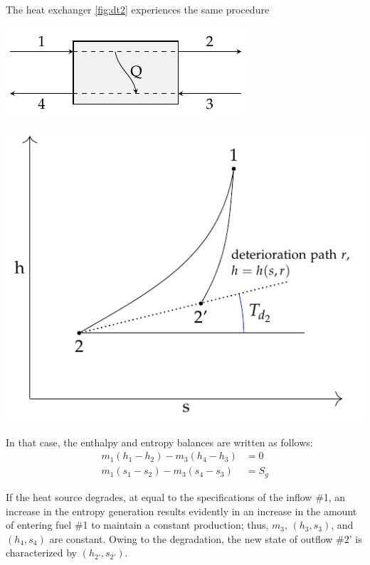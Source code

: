 \documentclass[energies,article,submit,moreauthors,pdftex]{Definitions/mdpi}
\begin{document}
The heat exchanger \cref{fig:dt2} experiences the same procedure  
\begin{center}
	\begin{minipage}[c]{0.38\linewidth}
		\centering
		\includegraphics{heater}
	\end{minipage}
	\begin{minipage}[c]{0.58\linewidth}
		\centering
		\includegraphics[scale=0.8]{dt2}
	\end{minipage}
	\label{fig:dt2}
\end{center}

In that case, the enthalpy and entropy balances are written as follows: 
\begin{align}
m_1 \left(h_1 - h_2 \right) - m_3 \left(h_4 -h_3\right) &= 0 \\
m_1 \left(s_1 - s_2 \right) - m_3 \left(s_4 - s_3 \right) &= S_g 
\end{align}

If the heat source degrades, at equal to the specifications of the inflow \#1, an increase in the entropy generation results evidently in an increase in the amount of entering fuel \#1 to maintain a constant production; thus, $m_3$, $(h_3, s_3)$, and $(h_4, s_4)$ are constant. Owing to the degradation, the new state of outflow \#2' is characterized by $(h_{2'}, s_{2'})$.   
\end{document}

